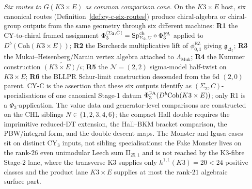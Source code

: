 \textsl{Six routes to \(G(K3\times E)\) as common comparison cone.}\enspace
On the \(K3\times E\) host, six canonical routes
(Definition~\ref{def:cy-c-six-routes}) produce chiral-algebra or
chiral-group outputs from the same geometry through six different
machines: \textbf{R1} the CY-to-chiral framed assignment
$\Phi_3^{(\Sigma_2, C)} = \mathrm{Sp}^{\mathrm{ch}}_{\Sigma_2, C} \circ \Phi^{\mathrm{FA}}_3$ applied
to $D^b(\mathrm{Coh}(K3 \times E))$; \textbf{R2} the Borcherds
multiplicative lift of \(\phi_{0,1}^{\mathrm{EZ}}\) giving
$\mathfrak{g}_{\Delta_5}$; \textbf{R3} the Mukai--Heisenberg/Narain
vertex algebra attached to \(\Lambda_{\mathrm{Muk}}\); \textbf{R4} the Kummer construction
$\widetilde{(K3\times E)/\iota}$; \textbf{R5} the
$\mathcal N=(2,2)$ sigma-model half-twist on $K3\times E$;
\textbf{R6} the BLLPR Schur-limit construction descended from the
$6$d $(2,0)$ parent. CY-C is the assertion that these six outputs
identify as $(\Sigma_2, C)$-specialisations of one canonical Stage-1
datum $\Phi^{\mathrm{FA}}_3(D^b\mathrm{Coh}(K3 \times E))$; only R1 is a
$\Phi_3$-application. The value data and generator-level comparisons
are constructed on the CHL siblings \(N\in\{1,2,3,4,6\}\); the
compact Hall double requires the imprimitive reduced-DT extension,
the Hall--BKM bracket comparison, the PBW/integral form, and the
double-descent maps. The Monster and Igusa cases sit on distinct
CY$_3$ inputs, not sibling specialisations: the Fake Monster lives on
the rank-$26$ even unimodular Leech sum $\mathrm{II}_{25,1}$ and is not
reached by the K3-fibre Stage-$2$ lane, where the transverse K3
supplies only \(h^{1,1}(K3)=20<24\) positive classes and the product
lane \(K3\times E\) supplies at most the rank-$21$ algebraic surface
part.

